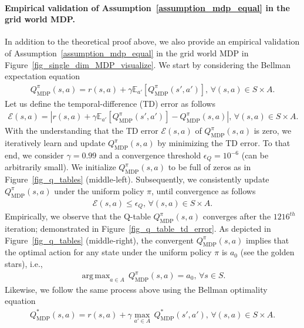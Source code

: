 \documentclass[10pt]{article}
\DeclareMathOperator*{\argmax}{arg\,max}
\def\mbE{{\ensuremath{\mathbb E}}}
\def\ccalE{{\ensuremath{\mathcal E}}}
\begin{document}
\paragraph{Empirical validation of Assumption~\ref{assumption_mdp_equal} in the grid world MDP.}
In addition to the theoretical proof above, we also provide an empirical validation of Assumption~\ref{assumption_mdp_equal} in the grid world MDP in Figure~\ref{fig_single_dim_MDP_visualize}.
We start by considering the Bellman expectation equation
    \begin{align}
        Q_\text{MDP}^{\pi}(s, a) = r(s, a) + \gamma \mbE_{a'} \left[ Q_\text{MDP}^{\pi}(s', a') \right], \, \forall (s, a) \in S \times A.
    \end{align}
Let us define the temporal-difference (TD) error as follows
\begin{align}
    \ccalE (s, a) = \left| r(s, a) + \gamma \mbE_{a'} \left[ Q_\text{MDP}^{\pi}(s', a') \right] - Q_\text{MDP}^{\pi}(s, a) \right|, \, \forall (s, a) \in S \times A.
\end{align}
With the understanding that the TD error $\ccalE (s, a)$ of $Q_\text{MDP}^{\pi}(s, a)$ is zero, we iteratively learn and update $Q_\text{MDP}^{\pi}(s, a)$ by minimizing the TD error. To that end, we consider $\gamma=0.99$ and a convergence threshold $\epsilon_Q = 10^{-6}$ (can be arbitrarily small). We initialize $Q_\text{MDP}^{\pi}(s, a)$ to be full of zeros as in Figure~\ref{fig_q_tables} (middle-left). Subsequently, we consistently update $Q_\text{MDP}^{\pi}(s, a)$ under the uniform policy $\pi$, until convergence as follows
    \begin{align}
        \ccalE (s, a) \leq \epsilon_Q, \, \forall (s, a) \in S \times A.
    \end{align}
Empirically, we observe that the Q-table $Q_\text{MDP}^{\pi}(s, a)$ converges after the $1216^{th}$ iteration; demonstrated in Figure~\ref{fig_q_table_td_error}.
    As depicted in Figure~\ref{fig_q_tables} (middle-right), the convergent $Q_\text{MDP}^{\pi}(s, a)$ implies that the optimal action for any state under the uniform policy $\pi$ is $a_0$ (see the golden stars), i.e.,
    \begin{align}
        \argmax_{ a \in A} \, Q_\text{MDP}^\pi(s, a) = a_0, \, \forall s \in S.
    \end{align}
    Likewise, we follow the same process above using the  Bellman optimality equation
    \begin{align}
        Q_\text{MDP}^*(s, a) = r(s, a) + \gamma \max_{a' \in A} \, Q_\text{MDP}^*(s', a'), \, \forall (s, a) \in S \times A.
    \end{align}
\end{document}
